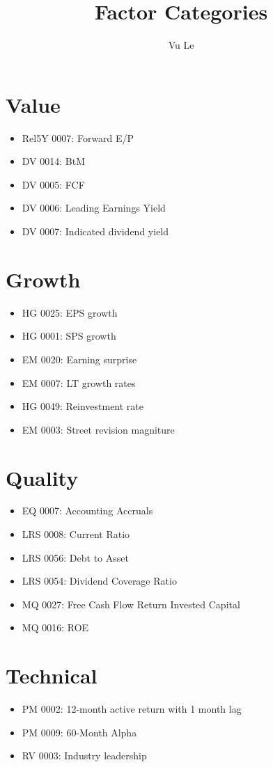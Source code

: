 \documentclass[a4paper]{report}
\begin{document}
\begin{article}
\title{Factor Categories}
\author{Vu Le}
\maketitle

\section{Value}
\begin{itemize}
\item Rel5Y 0007: Forward E/P
\item DV 0014: BtM
\item DV 0005: FCF
\item DV 0006: Leading Earnings Yield
\item DV 0007: Indicated dividend yield
\end{itemize}

\section{Growth}
\begin{itemize}
\item HG 0025: EPS growth
\item HG 0001: SPS growth
\item EM 0020: Earning surprise
\item EM 0007: LT growth rates
\item HG 0049: Reinvestment rate
\item EM 0003: Street revision magniture

\end{itemize}

\section{Quality}
\begin{itemize}
\item EQ 0007: Accounting Accruals
\item LRS 0008: Current Ratio
\item LRS 0056: Debt to Asset
\item LRS 0054: Dividend Coverage Ratio
\item MQ 0027: Free Cash Flow Return Invested Capital
\item MQ 0016: ROE
\end{itemize}

\section{Technical}
\begin{itemize}
\item PM 0002: 12-month active return with 1 month lag
\item PM 0009: 60-Month Alpha
\item RV 0003: Industry leadership 
\end{itemize}


\end{article}
\end{document}
